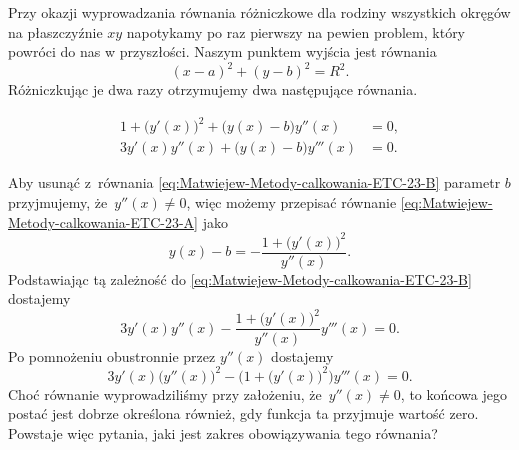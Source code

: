 \documentclass[a4paper,11pt]{article}
\numberwithin{equation}{section}
\begin{document}
\noindent
{} Przy okazji wyprowadzania równania różniczkowe dla rodziny
wszystkich okręgów na płaszczyźnie $xy$ napotykamy po raz pierwszy na
pewien problem, który powróci do nas w przyszłości. Naszym punktem wyjścia
jest równania
\begin{equation}
  \label{eq:Matwiejew-Metody-calkowania-ETC-22}
  ( x - a )^{ 2 } + ( y - b )^{ 2 } = R^{ 2 }.
\end{equation}
Różniczkując je dwa razy otrzymujemy dwa następujące równania.

\negVerSpaceFour


\begin{subequations}

  \begin{align}
    \label{eq:Matwiejew-Metody-calkowania-ETC-23-A}
    1 + \big( y'( x ) \big)^{ 2 } + \big( y( x ) - b \big) y''( x )
    &= 0, \\
    \label{eq:Matwiejew-Metody-calkowania-ETC-23-B}
    3 y'( x ) y''( x ) + \big( y( x ) - b \big) y'''( x )
    &= 0.
  \end{align}

\end{subequations}


\noindent
Aby usunąć z~równania \eqref{eq:Matwiejew-Metody-calkowania-ETC-23-B}
parametr $b$ przyjmujemy, że~$y''( x ) \neq 0$, więc możemy przepisać równanie
\eqref{eq:Matwiejew-Metody-calkowania-ETC-23-A} jako
\begin{equation}
  \label{eq:Matwiejew-Metody-calkowania-ETC-24}
  y( x ) - b =
  -\frac{ 1 + \big( y'( x ) \big)^{ 2 } }{ y''( x ) }.
\end{equation}
Podstawiając tą zależność do \eqref{eq:Matwiejew-Metody-calkowania-ETC-23-B}
dostajemy
\begin{equation}
  \label{eq:Matwiejew-Metody-calkowania-ETC-25}
  3 y'( x ) y''( x ) -
  \frac{ 1 + \big( y'( x ) \big)^{ 2 } }{ y''( x ) } y'''( x ) = 0.
\end{equation}
Po pomnożeniu obustronnie przez $y''( x )$ dostajemy
\begin{equation}
  \label{eq:Matwiejew-Metody-calkowania-ETC-26}
  3 y'( x ) \big( y''( x ) \big)^{ 2 } -
  \Big( 1 + \big( y'( x ) \big)^{ 2 } \Big) y'''( x ) = 0.
\end{equation}
Choć równanie wyprowadziliśmy przy założeniu, że~$y''( x ) \neq 0$, to końcowa
jego postać jest dobrze określona również, gdy funkcja ta przyjmuje wartość
zero. Powstaje więc pytania, jaki jest zakres obowiązywania tego równania?
\end{document}
